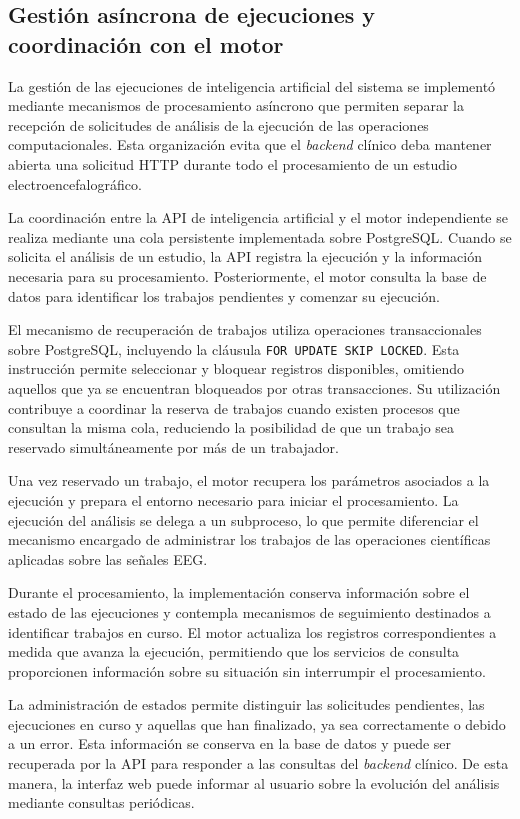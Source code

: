 \subsection{Gestión asíncrona de ejecuciones y coordinación con el motor}

La gestión de las ejecuciones de inteligencia
artificial del sistema se implementó mediante
mecanismos de procesamiento asíncrono que
permiten separar la recepción de solicitudes
de análisis de la ejecución de las operaciones
computacionales. Esta organización evita
que el \textit{backend} clínico deba mantener abierta
una solicitud HTTP durante todo el procesamiento
de un estudio electroencefalográfico.

La coordinación entre la API de inteligencia
artificial y el motor independiente se realiza
mediante una cola persistente implementada
sobre PostgreSQL. Cuando se solicita el análisis
de un estudio, la API registra la ejecución
y la información necesaria para su procesamiento.
Posteriormente, el motor consulta la base
de datos para identificar los trabajos
pendientes y comenzar su ejecución.

El mecanismo de recuperación de trabajos
utiliza operaciones transaccionales sobre
PostgreSQL, incluyendo la cláusula
\texttt{FOR UPDATE SKIP LOCKED}. Esta
instrucción permite seleccionar y bloquear
registros disponibles, omitiendo aquellos
que ya se encuentran bloqueados por otras
transacciones. Su utilización contribuye
a coordinar la reserva de trabajos cuando
existen procesos que consultan la misma
cola, reduciendo la posibilidad de que
un trabajo sea reservado simultáneamente
por más de un trabajador.

Una vez reservado un trabajo, el motor
recupera los parámetros asociados a la
ejecución y prepara el entorno necesario
para iniciar el procesamiento. La ejecución
del análisis se delega a un subproceso,
lo que permite diferenciar el mecanismo
encargado de administrar los trabajos
de las operaciones científicas aplicadas
sobre las señales EEG.

Durante el procesamiento, la implementación
conserva información sobre el estado de
las ejecuciones y contempla mecanismos
de seguimiento destinados a identificar
trabajos en curso. El motor actualiza
los registros correspondientes a medida
que avanza la ejecución, permitiendo
que los servicios de consulta proporcionen
información sobre su situación sin
interrumpir el procesamiento.

La administración de estados permite
distinguir las solicitudes pendientes,
las ejecuciones en curso y aquellas que
han finalizado, ya sea correctamente
o debido a un error. Esta información
se conserva en la base de datos y puede
ser recuperada por la API para responder
a las consultas del \textit{backend} clínico.
De esta manera, la interfaz web puede
informar al usuario sobre la evolución
del análisis mediante consultas periódicas.


